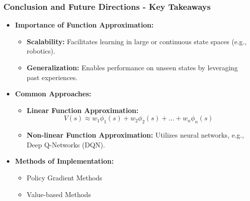 \documentclass[aspectratio=169]{beamer}
\begin{document}
\begin{frame}[fragile]
    \frametitle{Conclusion and Future Directions - Key Takeaways}
    \begin{itemize}
        \item \textbf{Importance of Function Approximation:}
        \begin{itemize}
            \item \textbf{Scalability:} Facilitates learning in large or continuous state spaces (e.g., robotics).
            \item \textbf{Generalization:} Enables performance on unseen states by leveraging past experiences.
        \end{itemize}
        
        \item \textbf{Common Approaches:}
        \begin{itemize}
            \item \textbf{Linear Function Approximation:} 
                \begin{equation}
                V(s) \approx w_1 \phi_1(s) + w_2 \phi_2(s) + \ldots + w_n \phi_n(s)
                \end{equation}
            \item \textbf{Non-linear Function Approximation:} Utilizes neural networks, e.g., Deep Q-Networks (DQN).
        \end{itemize}
        
        \item \textbf{Methods of Implementation:}
        \begin{itemize}
            \item Policy Gradient Methods
            \item Value-based Methods
        \end{itemize}
    \end{itemize}
\end{frame}
\end{document}
